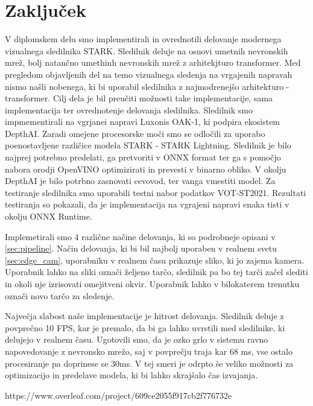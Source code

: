 \documentclass[a4paper,12pt,openright]{book}
\begin{document}
\chapter{Zaključek}
V diplomskem delu smo implementirali in ovrednotili delovanje modernega vizualnega sledilnika STARK. Sledilnik deluje na osnovi umetnih nevronskih mrež, bolj natančno umethinh nevronskih mrež z arhitekjturo transformer. Med pregledom objavljenih del na temo vizualnega sledenja na vrgajenih napravah nismo našli nobenega, ki bi uporabil sledilnika z najmodrenejšo arhitekturo - transformer. Cilj dela je bil preučiti možnosti take implementacije, sama implementacija ter ovrednotenje delovanja sledilnika. Sledilnik smo impmementirali na vgrjanei napravi Luxonis OAK-1, ki podpira ekosistem DepthAI. Zaradi omejene procesorske moči smo se odločili za uporabo poenostavljene različice modela STARK - STARK Lightning. Sledilnik je bilo najprej potrebno predelati, ga pretvoriti v ONNX format ter ga s pomočjo nabora orodji OpenVINO optimizirati in prevesti v binarno obliko. V okolju DepthAI je bilo potrbno zasnovati cevovod, ter vanga vmestiti model. Za testiranje sledilnika smo uporabili testni nabor podatkov VOT-ST2021. Rezultati testiranja so pokazali, da je implementacija na vgrajeni napravi enaka tisti v okolju ONNX Runtime.

Implemetirali smo 4 različne načine delovanja, ki so podrobneje opisani v \ref{sec:pipeline}. Način delovanja, ki bi bil najbolj uporaben v realnem svetu \ref{sec:edge_cam}, uporabniku v realnem času prikazuje sliko, ki jo zajema kamera. Uporabnik lahko na sliki označi željeno tarčo, sledilnik pa bo tej tarči začel slediti in okoli nje izrisovati omejitveni okvir. Uporabnik lahko v bilokaterem trenutku označi novo tarčo za sledenje.

Največja slabost naše implementacije je hitrost delovanja. Sledilnik deluje z povprečno 10 FPS, kar je premalo, da bi ga lahko uvrstili med sledilnike, ki delujejo v realnem času. Ugotovili smo, da je ozko grlo v sistemu ravno napovedovanje z nevronsko mrežo, saj v povprečju traja kar 68 ms, vse ostalo procesiranje pa doprinese se 30ms. V tej smeri je odrpto še veliko možnosti za optimizacijo in predelave modela, ki bi lahko skrajšalo čas izvajanja.


\printbibliography[heading=bibintoc,type=article,title={Članki v revijah}]
https://www.overleaf.com/project/609ce2055f917cb2f776732e
\printbibliography[heading=bibintoc,type=inproceedings,title={Članki v zbornikih}]

\printbibliography[heading=bibintoc,type=incollection,title={Poglavja v knjigah}]

\printbibliography[heading=bibintoc,title={Celotna literatura}]
\end{document}
